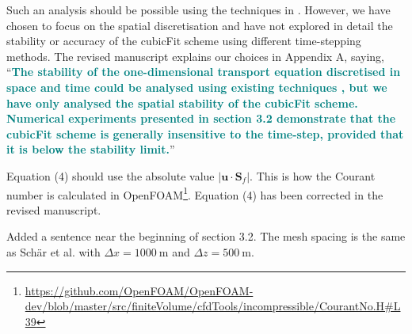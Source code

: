 \documentclass[times]{elsarticle}
\newcommand{\revtwo}[1]{\textcolor{teal}{\textbf{#1}}}
\begin{document}
\begin{quotation}
\begin{comment}
\item Might it be possible to include the time discretization (2) in the stability analysis?
It would be interesting to know if the weak instability of (2) (noted on p3) affects
the constraints (57), (58), (63).
\end{comment}
\end{quotation}
Such an analysis should be possible using the techniques in \citep{baldauf2008}.  However, we have chosen to focus on the spatial discretisation and have not explored in detail the stability or accuracy of the cubicFit scheme using different time-stepping methods.  The revised manuscript explains our choices in Appendix A, saying, ``\revtwo{The stability of the one-dimensional transport equation discretised in space and time could be analysed using existing techniques \citep{baldauf2008}, but we have only analysed the spatial stability of the cubicFit scheme.  Numerical experiments presented in section 3.2 demonstrate that the cubicFit scheme is generally insensitive to the time-step, provided that it is below the stability limit.}''

\begin{quotation}
\begin{comment}
\item The Courant number as defined by (4) would appear to vanish for a non-divergent
flow. A more natural definition might be to sum only over outflow faces (and
remove the factor $1/2$). For non-divergent flow that would be equivalent to
replacing $\mathbf{u} \cdot \mathbf{S}_f$ by $| \mathbf{u} \cdot \mathbf{S}_f |$
in~(4).
\end{comment}
\end{quotation}
Equation (4) should use the absolute value $\lvert \mathbf{u} \cdot \mathbf{S}_f \rvert$.  This is how the Courant number is calculated in OpenFOAM\footnote{\url{https://github.com/OpenFOAM/OpenFOAM-dev/blob/master/src/finiteVolume/cfdTools/incompressible/CourantNo.H\#L39}}.  Equation (4) has been corrected in the revised manuscript.

\begin{quotation}
\begin{comment}
\item Section 3.2 and Table~1: what resolution is used?
\end{comment}
\end{quotation}
Added a sentence near the beginning of section 3.2.  The mesh spacing is the same as Sch\"ar et al. \citep{schaer2002} with $\Delta x = \SI{1000}{\meter}$ and $\Delta z = \SI{500}{\meter}$.
\end{document}
